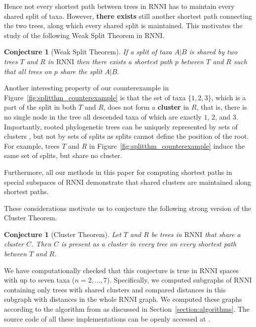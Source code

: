 \documentclass{amsart}
\newcommand{\rnni}{\mathrm{RNNI}}
\newtheorem{conjecture}[definition]{Conjecture}
\begin{document}
Hence not every shortest path between trees in $\rnni$ has to maintain every shared split of taxa.
However, \textbf{there exists} still another shortest path connecting the two trees, along which every shared split is maintained.
This motivates the study of the following Weak Split Theorem in $\rnni$.

\begin{conjecture}[Weak Split Theorem]
If a split of taxa $A | B$ is shared by two trees $T$ and $R$ in $\rnni$ then there exists a shortest path $p$ between $T$ and $R$ such that all trees on $p$ share the split $A | B$.
\label{conjecture:split_theorem}
\end{conjecture}

Another interesting property of our counterexample in Figure~\ref{fig:splitthm_counterexample} is that the set of taxa $\{1, 2, 3\}$, which is a part of the split in both $T$ and $R$, does not form a \textbf{cluster} in $R$, that is, there is no single node in the tree all descended taxa of which are exactly $1$, $2$, and $3$.
Importantly, rooted phylogenetic trees can be uniquely represented by sets of clusters \autocite{Steel2016-ye}, but not by sets of splits as splits cannot define the position of the root.
For example, trees $T$ and $R$ in Figure~\ref{fig:splitthm_counterexample} induce the same set of splits, but share no cluster.

Furthermore, all our methods in this paper for computing shortest paths in special subspaces of $\rnni$ demonstrate that shared clusters are maintained along shortest paths.

These considerations motivate us to conjecture the following strong version of the Cluster Theorem.

\begin{conjecture}[Cluster Theorem]
Let $T$ and $R$ be trees in $\rnni$ that share a cluster $C$.
Then $C$ is present as a cluster in every tree on every shortest path between $T$ and $R$.
\label{conjecture:cluster_theorem}
\end{conjecture}

We have computationally checked that this conjecture is true in $\rnni$ spaces with up to seven taxa ($n = 2, \ldots, 7$).
Specifically, we computed subgraphs of $\rnni$ containing only trees with shared clusters and compared distances in this subgraph with distances in the whole $\rnni$ graph.
We computed these graphs according to the algorithm from \autocite{Gavryushkin2018-ol} as discussed in Section~\ref{section:algorithms}.
The source code of all these implementations can be openly accessed at \autocite{Collienne2019}.
\end{document}
